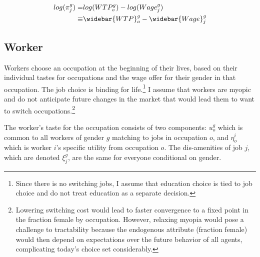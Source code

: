 \documentclass[12pt]{article}
\begin{document}

\begin{align} \label{logfirm}
  log(\pi^g_j)=&  log(WTP^g_o) -  log(Wage^g_j) \\ \nonumber
  \equiv & \widebar{WTP}^g_o - \widebar{Wage}^g_j
\end{align}







\subsection{Worker}

Workers choose an occupation at the beginning of their lives, based on their individual tastes for occupations and the wage offer for their gender in that occupation. The job choice is binding for life.\footnote{Since there is no switching jobs, I assume that education choice is tied to job choice and do not treat education as a separate decision.} I assume that workers are myopic and do not anticipate future changes in the market that would lead them to want to switch occupations.\footnote{Lowering switching cost would lead to faster convergence to a fixed point in the fraction female by occupation. However, relaxing myopia would pose a challenge to tractability because the endogenous attribute (fraction female) would then depend on expectations over the future behavior of all agents, complicating today's choice set considerably.}

The worker's taste for the occupation consists of two components: $u^g_o$ which is common to all workers of gender $g$ matching to jobs in occupation $o$, and $\eta^i_o$ which is worker $i$'s specific utility from occupation $o$. The dis-amenities of job $j$, which are denoted $\xi^g_j$, are the same for everyone conditional on gender.
\end{document}
